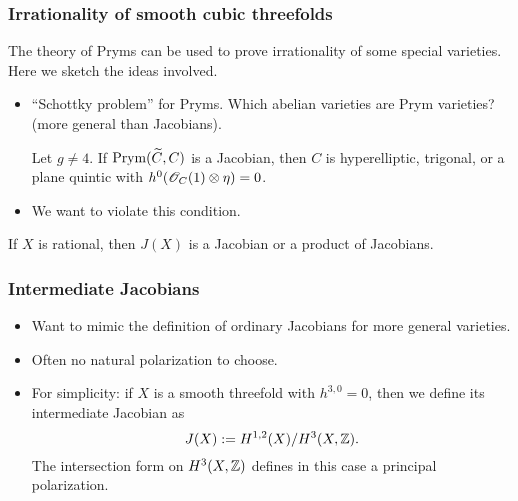 \begin{frame}
\frametitle{Irrationality of smooth cubic threefolds}

The theory of Pryms can be used to prove irrationality of some special varieties. Here we sketch the ideas involved.
\pause

\begin{itemize}
	\item ``Schottky problem'' for Pryms. Which abelian varieties are Prym varieties? (more general than Jacobians).
	\begin{theorem}[Shokurov]
	Let $g \neq 4$. If $\operatorname{Prym}(\widetilde C, C)$ is a Jacobian, then $C$ is hyperelliptic, trigonal, or a plane quintic with $h^0(\mathscr{O}_C(1) \otimes \eta)=0$. 
	\end{theorem}
	\pause
	\item We want to violate this condition.
\end{itemize}

\begin{theorem}
If $X$ is rational, then $J(X)$ is a Jacobian or a product of Jacobians.
\end{theorem}

\end{frame}

\begin{frame}
\frametitle{Intermediate Jacobians}

\begin{itemize}
	\item Want to mimic the definition of ordinary Jacobians for more general varieties.
	\item Often no natural polarization to choose.
	\item For simplicity: if $X$ is a smooth threefold with $h^{3,0}=0$, then we define its \alert{intermediate Jacobian} as
	\[
	J(X) := H^{1,2}(X)/H^3(X,\mathbb{Z}).
	\]
	The intersection form on $H^3(X,\mathbb{Z})$ defines in this case a principal polarization.
\end{itemize}

\end{frame}

